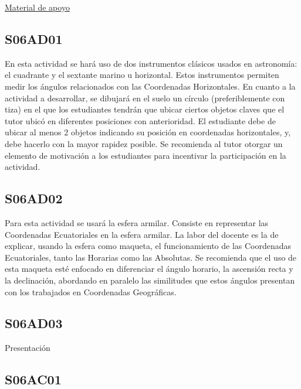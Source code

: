 \documentclass[10pt,a4paper]{article}
\begin{document}
\href{https://drive.google.com/open?id=12NxsFNSEWnwG91Cd1T0vwuFTxzpM6C9NfwtiAmDwlz8}{Material de apoyo}
\subsection{S06AD01}
En esta actividad se hará uso de dos instrumentos clásicos usados en astronomía: el cuadrante y el sextante marino u horizontal. Estos instrumentos permiten medir los ángulos relacionados con las Coordenadas Horizontales. En cuanto a la actividad a desarrollar, se dibujará en el suelo un círculo (preferiblemente con tiza) en el que los estudiantes tendrán que ubicar ciertos objetos claves que el tutor ubicó en diferentes posiciones con anterioridad. El estudiante debe de ubicar al menos 2 objetos indicando su posición en coordenadas horizontales, y, debe hacerlo con la mayor rapidez posible. Se recomienda al tutor otorgar un elemento de motivación a los estudiantes para incentivar la participación en la actividad.


\subsection{S06AD02}
Para esta actividad se usará la esfera armilar. Consiste en representar las Coordenadas Ecuatoriales en la esfera armilar. La labor del docente es la de explicar, usando la esfera como maqueta, el funcionamiento de las Coordenadas Ecuatoriales, tanto las Horarias como las Absolutas. Se recomienda que el uso de esta maqueta esté enfocado en diferenciar el ángulo horario, la ascensión recta y la declinación, abordando en paralelo las similitudes que estos ángulos presentan con los trabajados en Coordenadas Geográficas.

\subsection{S06AD03}
Presentación


\subsection{S06AC01}
\end{document}
